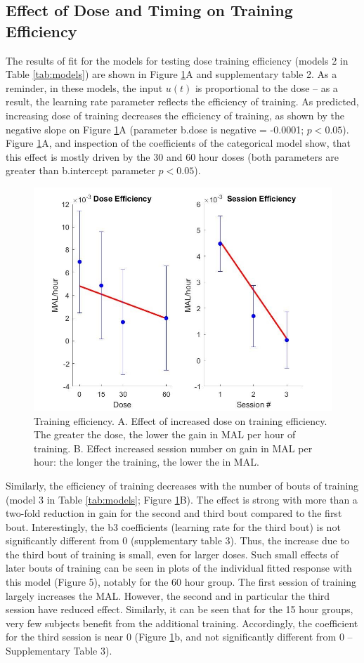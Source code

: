 \subsection{Effect of Dose and Timing on Training Efficiency}
The results of fit for the models for testing dose training efficiency (models 2 in Table \ref{tab:models}) are shown in Figure \ref{fig:doseefficiency}A and supplementary table 2. 
As a reminder, in these models, the input $ u(t) $ is proportional to the dose – as a result, the learning rate parameter reflects the efficiency of training. 
As predicted, increasing dose of training decreases the efficiency of training, as shown by the negative slope on Figure \ref{fig:doseefficiency}A (parameter b.dose is negative  = -0.0001; $ p < 0.05 $). 
Figure \ref{fig:doseefficiency}A, and inspection of the coefficients of the categorical model show, that this effect is mostly driven by the 30 and 60 hour doses (both parameters are greater than b.intercept parameter $ p < 0.05 $).


\begin{figure}
	\centering
	\includegraphics[width=0.7\linewidth]{figures/doseEfficiency}
	\caption[Training efficiency.]{Training efficiency. 
		A. Effect of increased dose on training efficiency. The greater the dose, the lower the gain in MAL per hour of training. 
		B. Effect increased session number on gain in MAL per hour: the longer the training, the lower the in MAL.}
	\label{fig:doseefficiency}
\end{figure}


Similarly, the efficiency of training decreases with the number of bouts of training (model 3 in Table \ref{tab:models}; Figure \ref{fig:doseefficiency}B). 
The effect is strong with more than a two-fold reduction in gain for the second and third bout compared to the first bout. 
Interestingly, the b3 coefficients (learning rate for the third bout) is not significantly different from 0 (supplementary table 3). 
Thus, the increase due to the third bout of training is small, even for larger doses. 
Such small effects of later bouts of training can be seen in plots of the individual fitted response with this model (Figure 5), notably for the 60 hour group. 
The first session of training largely increases the MAL. 
However, the second and in particular the third session have reduced effect. 
Similarly, it can be seen that for the 15 hour groups, very few subjects benefit from the additional training. 
Accordingly, the coefficient for the third session is near 0 (Figure \ref{fig:doseefficiency}b, and not significantly different from 0 – Supplementary Table 3).

